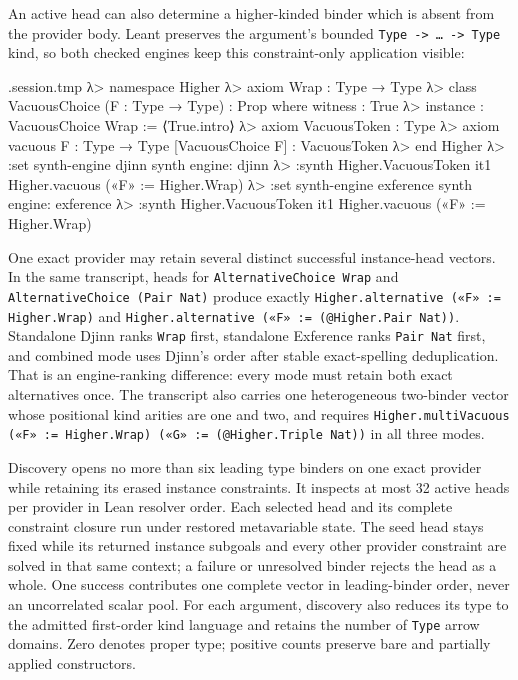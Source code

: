 \documentclass[11pt,oneside]{article}
\newcommand{\code}[1]{\texttt{#1}}
\newenvironment{session}
 {\VerbatimEnvironment\begin{VerbatimOut}{\jobname.session.tmp}}
 {\end{VerbatimOut}%
  \begin{sessionouter}%
  \VerbatimInput[fontsize=\footnotesize, breaklines=true,
    breaksymbolleft={\textcolor{stone}{\footnotesize$\hookrightarrow$}},
    formatcom=\color{ink}, tabsize=4]{\jobname.session.tmp}%
  \end{sessionouter}}
\begin{document}
An active head can also determine a higher-kinded binder which is absent from
the provider body. Leant preserves the argument's bounded
\code{Type~->~\dots~->~Type} kind, so both checked engines keep this
constraint-only application visible:

\begin{session}
λ> namespace Higher
λ> axiom Wrap : Type → Type
λ> class VacuousChoice (F : Type → Type) : Prop where witness : True
λ> instance : VacuousChoice Wrap := ⟨True.intro⟩
λ> axiom VacuousToken : Type
λ> axiom vacuous {F : Type → Type} [VacuousChoice F] : VacuousToken
λ> end Higher
λ> :set synth-engine djinn
synth engine: djinn
λ> :synth Higher.VacuousToken
  it1  Higher.vacuous («F» := Higher.Wrap)
λ> :set synth-engine exference
synth engine: exference
λ> :synth Higher.VacuousToken
  it1  Higher.vacuous («F» := Higher.Wrap)
\end{session}

One exact provider may retain several distinct successful instance-head
vectors. In the same transcript, heads for \code{AlternativeChoice Wrap} and
\code{AlternativeChoice (Pair Nat)} produce exactly
\code{Higher.alternative («F» := Higher.Wrap)} and
\code{Higher.alternative («F» := (@Higher.Pair Nat))}. Standalone Djinn ranks
\code{Wrap} first, standalone Exference ranks \code{Pair Nat} first, and
combined mode uses Djinn's order after stable exact-spelling deduplication.
That is an engine-ranking difference: every mode must retain both exact
alternatives once. The transcript also carries one heterogeneous two-binder
vector whose positional kind arities are one and two, and requires
\code{Higher.multiVacuous («F» := Higher.Wrap) («G» := (@Higher.Triple Nat))}
in all three modes.

Discovery opens no more than six leading type binders on one exact
provider while retaining its erased instance constraints. It inspects at most
32 active heads per provider in Lean resolver order. Each selected head and its
complete constraint closure run under restored metavariable state. The seed
head stays fixed while its returned instance subgoals and every other provider
constraint are solved in that same context; a failure or unresolved binder
rejects the head as a whole. One success contributes one complete vector in
leading-binder order, never an uncorrelated scalar pool. For each argument,
discovery also reduces its type to the admitted first-order kind language and
retains the number of \code{Type} arrow domains. Zero denotes proper type;
positive counts preserve bare and partially applied constructors.
\end{document}
